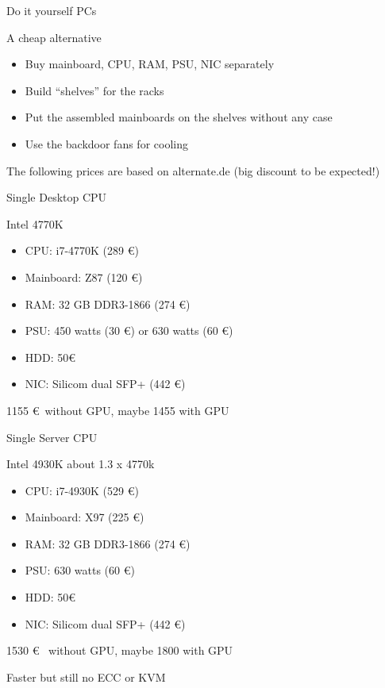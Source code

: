 \begin{frame}{Do it yourself PCs}{}
	\begin{block}{A cheap alternative}
		\begin{itemize}
	  		\item Buy mainboard, CPU, RAM, PSU, NIC separately
	  		\item Build ``shelves'' for the racks
	  		\item Put the assembled mainboards on the shelves without any case
	  		\item Use the backdoor fans for cooling
	  			  		 
		\end{itemize}	
	\end{block}
	
	The following prices are based on alternate.de (big discount to be expected!)
\end{frame}

\begin{frame}{Single Desktop CPU}{}
	\begin{block}{Intel 4770K}
		\begin{itemize}
	  		\item CPU: i7-4770K (289 \euro)
	  		\item Mainboard: Z87 (120 \euro)
	  		\item RAM: 32 GB DDR3-1866 (274 \euro)
	  		\item PSU: 450 watts (30 \euro) or 630 watts (60 \euro)
	  		\item HDD: 50\euro
	  		\item NIC: Silicom dual SFP+ (442 \euro)
		\end{itemize}	
		\begin{ergo}
			1155 \euro~without GPU, maybe 1455 with GPU
		\end{ergo}
	\end{block}
\end{frame}

\begin{frame}{Single Server CPU}{}
	\begin{block}{Intel 4930K about 1.3 x 4770k}
		\begin{itemize}
	  		\item CPU: i7-4930K (529 \euro)
	  		\item Mainboard: X97 (225 \euro)
	  		\item RAM: 32 GB DDR3-1866 (274 \euro)
	  		\item PSU: 630 watts (60 \euro)
	  		\item HDD: 50\euro
	  		\item NIC: Silicom dual SFP+ (442 \euro)
		\end{itemize}	
		\begin{ergo}
			1530 \euro~ without GPU, maybe 1800 with GPU
		\end{ergo}
	\end{block}
	Faster but still no ECC or KVM
\end{frame}



